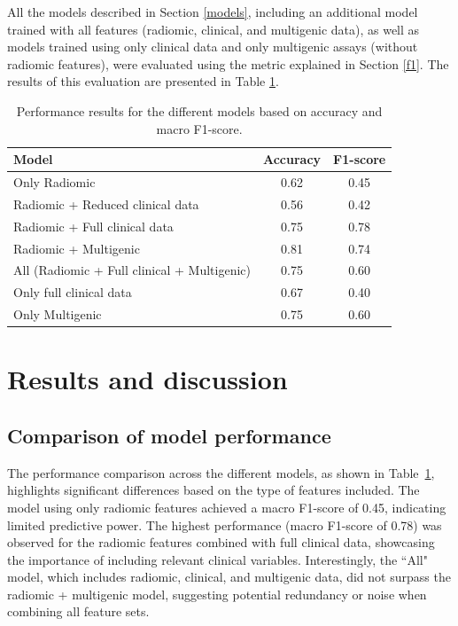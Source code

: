 \documentclass[conference]{IEEEtran}
\begin{document}
All the models described in Section \ref{models}, including an additional model trained with all features (radiomic, clinical, and multigenic data), as well as models trained using only clinical data and only multigenic assays (without radiomic features), were evaluated using the metric explained in Section \ref{f1}. The results of this evaluation are presented in Table \ref{tab:model_performance}.

\begin{table}
\centering
\begin{tabular}{lcc}
\hline
\textbf{Model} & \textbf{Accuracy} & \textbf{F1-score} \\
\hline
Only Radiomic & 0.62 & 0.45 \\
Radiomic + Reduced clinical data & 0.56 & 0.42 \\
Radiomic + Full clinical data & 0.75 & 0.78 \\
Radiomic + Multigenic & 0.81 & 0.74 \\
All (Radiomic + Full clinical + Multigenic) & 0.75 & 0.60 \\
Only full clinical data & 0.67 & 0.40 \\
Only Multigenic & 0.75 & 0.60 \\
\hline
\end{tabular}
\vspace{3mm}
\caption{Performance results for the different models based on accuracy and macro F1-score.}
\label{tab:model_performance}
\end{table}


\section{Results and discussion}

\subsection{Comparison of model performance}

The performance comparison across the different models, as shown in Table~\ref{tab:model_performance}, highlights significant differences based on the type of features included. The model using only radiomic features achieved a macro F1-score of 0.45, indicating limited predictive power. The highest performance (macro F1-score of 0.78) was observed for the radiomic features combined with full clinical data, showcasing the importance of including relevant clinical variables. Interestingly, the ``All" model, which includes radiomic, clinical, and multigenic data, did not surpass the radiomic + multigenic model, suggesting potential redundancy or noise when combining all feature sets.
\end{document}
